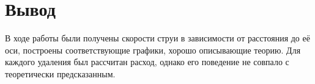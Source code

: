 
    \section{Вывод}
        В ходе работы были получены скорости струи в зависимости от расстояния до её оси, построены соответствующие графики, хорошо описывающие теорию. Для каждого удаления был рассчитан расход, однако его поведение не совпало с теоретически предсказанным.


